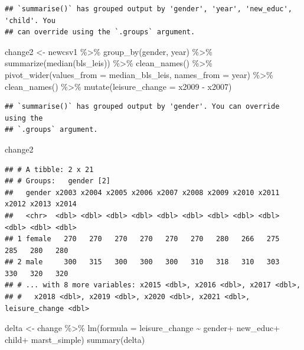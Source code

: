 \documentclass[
]{article}
\newenvironment{Shaded}{\begin{snugshade}}{\end{snugshade}}
\newcommand{\AttributeTok}[1]{\textcolor[rgb]{0.77,0.63,0.00}{#1}}
\newcommand{\FunctionTok}[1]{\textcolor[rgb]{0.00,0.00,0.00}{#1}}
\newcommand{\NormalTok}[1]{#1}
\newcommand{\OtherTok}[1]{\textcolor[rgb]{0.56,0.35,0.01}{#1}}
\newcommand{\SpecialCharTok}[1]{\textcolor[rgb]{0.00,0.00,0.00}{#1}}
\begin{document}
\begin{verbatim}
## `summarise()` has grouped output by 'gender', 'year', 'new_educ', 'child'. You
## can override using the `.groups` argument.
\end{verbatim}

\begin{Shaded}
\begin{Highlighting}[]
\NormalTok{change2 }\OtherTok{\textless{}{-}}\NormalTok{ newcsv1 }\SpecialCharTok{\%\textgreater{}\%}
  \FunctionTok{group\_by}\NormalTok{(gender, year) }\SpecialCharTok{\%\textgreater{}\%}
  \FunctionTok{summarize}\NormalTok{(}\FunctionTok{median}\NormalTok{(bls\_leis)) }\SpecialCharTok{\%\textgreater{}\%}
  \FunctionTok{clean\_names}\NormalTok{() }\SpecialCharTok{\%\textgreater{}\%}
  \FunctionTok{pivot\_wider}\NormalTok{(}\AttributeTok{values\_from =}\NormalTok{ median\_bls\_leis, }\AttributeTok{names\_from =}\NormalTok{ year) }\SpecialCharTok{\%\textgreater{}\%}
  \FunctionTok{clean\_names}\NormalTok{() }\SpecialCharTok{\%\textgreater{}\%}
  \FunctionTok{mutate}\NormalTok{(}\AttributeTok{leisure\_change =}\NormalTok{ x2009 }\SpecialCharTok{{-}}\NormalTok{ x2007)}
\end{Highlighting}
\end{Shaded}

\begin{verbatim}
## `summarise()` has grouped output by 'gender'. You can override using the
## `.groups` argument.
\end{verbatim}

\begin{Shaded}
\begin{Highlighting}[]
\NormalTok{change2}
\end{Highlighting}
\end{Shaded}

\begin{verbatim}
## # A tibble: 2 x 21
## # Groups:   gender [2]
##   gender x2003 x2004 x2005 x2006 x2007 x2008 x2009 x2010 x2011 x2012 x2013 x2014
##   <chr>  <dbl> <dbl> <dbl> <dbl> <dbl> <dbl> <dbl> <dbl> <dbl> <dbl> <dbl> <dbl>
## 1 female   270   270   270   270   270   270   280   266   275   285   280   280
## 2 male     300   315   300   300   300   310   318   310   303   330   320   320
## # ... with 8 more variables: x2015 <dbl>, x2016 <dbl>, x2017 <dbl>,
## #   x2018 <dbl>, x2019 <dbl>, x2020 <dbl>, x2021 <dbl>, leisure_change <dbl>
\end{verbatim}

\begin{Shaded}
\begin{Highlighting}[]
\NormalTok{delta }\OtherTok{\textless{}{-}}\NormalTok{ change }\SpecialCharTok{\%\textgreater{}\%}
  \FunctionTok{lm}\NormalTok{(}\AttributeTok{formula =}\NormalTok{ leisure\_change }\SpecialCharTok{\textasciitilde{}}\NormalTok{ gender}\SpecialCharTok{+}\NormalTok{ new\_educ}\SpecialCharTok{+}\NormalTok{ child}\SpecialCharTok{+}\NormalTok{ marst\_simple)}
\FunctionTok{summary}\NormalTok{(delta)}
\end{Highlighting}
\end{Shaded}
\end{document}
